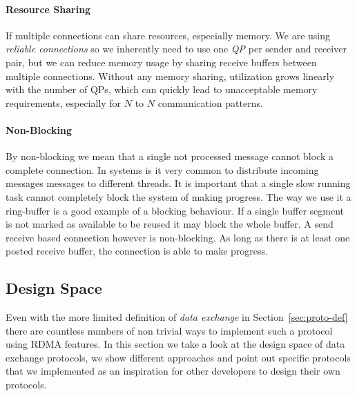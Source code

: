 \paragraph{Resource Sharing} If multiple connections can share resources, especially memory. We are using \emph{reliable connections}
so we inherently need to use one \emph{QP} per sender and receiver pair, but we can reduce memory usage by sharing receive 
buffers between multiple connections. Without any memory sharing, utilization grows linearly with the number of QPs, which 
can quickly lead to unacceptable memory requirements, especially for $N$ to $N$ communication patterns.

\paragraph{Non-Blocking} By non-blocking we mean that a single not processed message cannot block a complete connection. 
In systems
is it very common to distribute incoming messages messages to different threads. It is important that a single slow running 
task cannot completely block the system of making progress. The way we use it a ring-buffer is a good example of a blocking
behaviour. If a single buffer segment is not marked as available to be reused it may block the whole buffer. A send receive 
based connection however is non-blocking. As long as there is at least one posted receive buffer, the connection is able to
make progress.




\subsection{Design Space} \label{sec:proto-ds}


Even with the more limited definition of \emph{data exchange} in Section~\ref{sec:proto-def} there are countless numbers
of non trivial ways to implement such a protocol using RDMA features. In this section we take a look at the design 
space of data exchange protocols, we show different approaches and point out specific protocols that we implemented
as an inspiration for other developers to design their own protocols.


